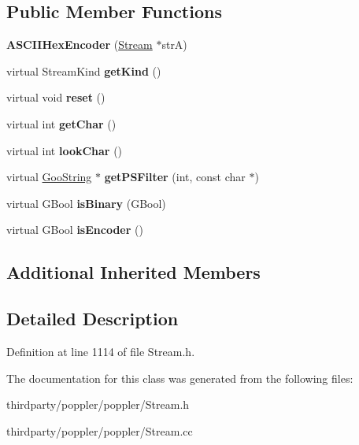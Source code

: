 \subsection*{Public Member Functions}
\begin{DoxyCompactItemize}
\item 
\mbox{\label{class_a_s_c_i_i_hex_encoder_a786f47b5aa8b1fe8e2520b0fe44845de}} 
{\bfseries A\+S\+C\+I\+I\+Hex\+Encoder} (\hyperlink{class_stream}{Stream} $\ast$strA)
\item 
\mbox{\label{class_a_s_c_i_i_hex_encoder_aea6aac6cd04489d793fa8d7a312469c0}} 
virtual Stream\+Kind {\bfseries get\+Kind} ()
\item 
\mbox{\label{class_a_s_c_i_i_hex_encoder_acba54986907c61c9f7cc08690adb4f19}} 
virtual void {\bfseries reset} ()
\item 
\mbox{\label{class_a_s_c_i_i_hex_encoder_a89de9c59e728072e7b1c875a055da9ab}} 
virtual int {\bfseries get\+Char} ()
\item 
\mbox{\label{class_a_s_c_i_i_hex_encoder_abf45ad2ae5631d8666c4e94817263bb3}} 
virtual int {\bfseries look\+Char} ()
\item 
\mbox{\label{class_a_s_c_i_i_hex_encoder_a80b0cd2280b37f777a6ee1c124f2374d}} 
virtual \hyperlink{class_goo_string}{Goo\+String} $\ast$ {\bfseries get\+P\+S\+Filter} (int, const char $\ast$)
\item 
\mbox{\label{class_a_s_c_i_i_hex_encoder_ae18ac7e3100ffa634acb432a18cbb9fa}} 
virtual G\+Bool {\bfseries is\+Binary} (G\+Bool)
\item 
\mbox{\label{class_a_s_c_i_i_hex_encoder_a24be3af7149b83404216f51eb85582e2}} 
virtual G\+Bool {\bfseries is\+Encoder} ()
\end{DoxyCompactItemize}
\subsection*{Additional Inherited Members}


\subsection{Detailed Description}


Definition at line 1114 of file Stream.\+h.



The documentation for this class was generated from the following files\+:\begin{DoxyCompactItemize}
\item 
thirdparty/poppler/poppler/Stream.\+h\item 
thirdparty/poppler/poppler/Stream.\+cc\end{DoxyCompactItemize}

